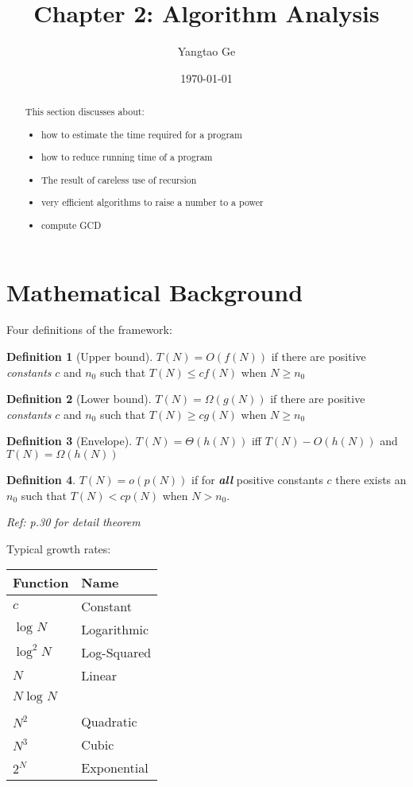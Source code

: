 \documentclass[12pt]{article}
\title{Chapter 2: Algorithm Analysis}
\author{Yangtao Ge}
\date{\today}
\theoremstyle{definition}
\newtheorem{definition}{Definition}[section]
\begin{document}
\maketitle
\begin{abstract}
This section discusses about:
\begin{itemize}
    \item how to estimate the time required for a program
    \item how to reduce running time of a program
    \item The result of careless use of recursion
    \item very efficient algorithms to raise a number to a power
    \item compute GCD
\end{itemize}
\end{abstract}
\section{Mathematical Background}
Four definitions of the framework:
\begin{definition}[Upper bound]
    $T(N) = O(f(N))$ if there are positive \emph{constants} $c$ and $n_0$ such that $T(N) \leq cf(N)$
    when $N \geq n_0$
\end{definition}

\begin{definition}[Lower bound]
    $T(N) = \Omega(g(N))$ if there are positive \emph{constants} $c$ and $n_0$ such that $T(N) \geq cg(N)$
    when $N \geq n_0$
\end{definition}

\begin{definition}[Envelope]
    $T(N) = \Theta(h(N))$ iff $T(N) - O(h(N))$ and $T(N) = \Omega(h(N))$
\end{definition}

\begin{definition}
    $T(N) = o(p(N))$ if for \textbf{\textit{all}} positive constants $c$ there exists an $n_0$ such that
    $T(N) < cp(N)$ when $N > n_0$.
\end{definition}
\emph{Ref: p.30 for detail theorem}

Typical growth rates:\newline
\begin{tabular}{|p{3cm}|p{5cm}|}
    \hline
    Function & Name\\
    \hline
    \hline
    $c$ & Constant \\
    $\log_{}N$ & Logarithmic \\
    $\log^2_{}N$ & Log-Squared \\
    $N$ & Linear \\
    $N\log_{}N$ & \ \\ 
    $N^2$ & Quadratic \\
    $N^3$ & Cubic \\
    $2^N$ & Exponential \\ 
    \hline
\end{tabular}
\end{document}
